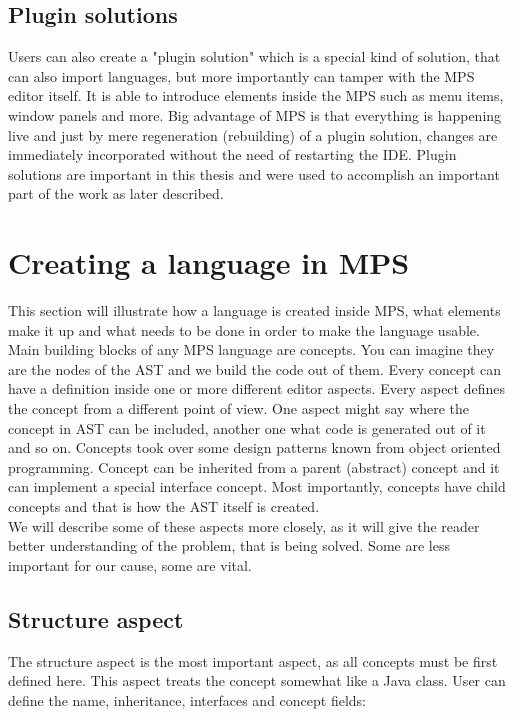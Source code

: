 \subsection{Plugin solutions}

Users can also create a "plugin solution" which is a special kind of solution, that can also import languages, but more importantly can tamper with the MPS editor itself. It is able to introduce elements inside the MPS such as menu items, window panels and more. Big advantage of MPS is that everything is happening live and just by mere regeneration (rebuilding) of a plugin solution, changes are immediately incorporated without the need of restarting the IDE. Plugin solutions are important in this thesis and were used to accomplish an important part of the work as later described.

\section{Creating a language in MPS}

This section will illustrate how a language is created inside MPS, what elements make it up and what needs to be done in order to make the language usable. 
\\

Main building blocks of any MPS language are concepts. You can imagine they are the nodes of the AST and we build the code out of them. Every concept can have a definition inside one or more different editor aspects. Every aspect defines the concept from a different point of view. One aspect might say where the concept in AST can be included, another one what code is generated out of it and so on. Concepts took over some design patterns known from object oriented programming. Concept can be inherited from a parent (abstract) concept and it can implement a special interface concept. Most importantly, concepts have child concepts and that is how the AST itself is created.
\\

We will describe some of these aspects more closely, as it will give the reader better understanding of the problem, that is being solved. Some are less important for our cause, some are vital.

\subsection{Structure aspect}
The structure aspect is the most important aspect, as all concepts must be first defined here. This aspect treats the concept somewhat like a Java class. User can define the name, inheritance, interfaces and concept fields:

